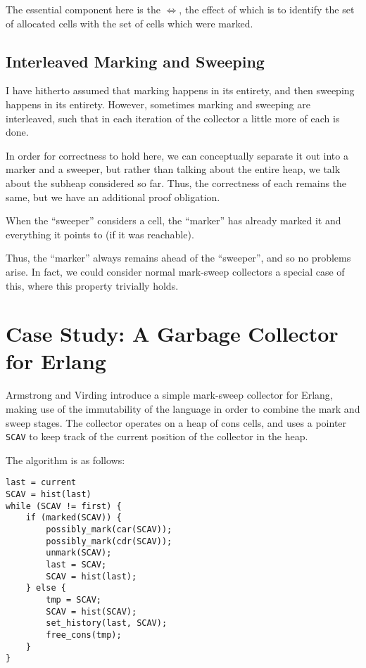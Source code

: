 The essential component here is the $\iff$, the effect of which is to
identify the set of allocated cells with the set of cells which were
marked.

\subsection{Interleaved Marking and Sweeping}
\label{sec:marksweep-sweeping-interleaved}

I have hitherto assumed that marking happens in its entirety, and then
sweeping happens in its entirety. However, sometimes marking and
sweeping are interleaved, such that in each iteration of the collector
a little more of each is done.

In order for correctness to hold here, we can conceptually separate it
out into a marker and a sweeper, but rather than talking about the
entire heap, we talk about the subheap considered so far. Thus, the
correctness of each remains the same, but we have an additional proof
obligation.

\begin{definition}
  \label{def:ms-interleaved}
  When the ``sweeper'' considers a cell, the ``marker'' has already
  marked it and everything it points to (if it was reachable).
\end{definition}

Thus, the ``marker'' always remains ahead of the ``sweeper'', and so
no problems arise. In fact, we could consider normal mark-sweep
collectors a special case of this, where this property trivially
holds.

\section{Case Study: A Garbage Collector for Erlang}
\label{sec:marksweep-example}

Armstrong and Virding\cite{Armstrong95} introduce a simple mark-sweep
collector for Erlang, making use of the immutability of the language
in order to combine the mark and sweep stages. The collector operates
on a heap of cons cells, and uses a pointer \texttt{SCAV} to keep
track of the current position of the collector in the heap.

The algorithm is as follows:

\begin{lstlisting}
last = current
SCAV = hist(last)
while (SCAV != first) {
    if (marked(SCAV)) {
        possibly_mark(car(SCAV));
        possibly_mark(cdr(SCAV));
        unmark(SCAV);
        last = SCAV;
        SCAV = hist(last);
    } else {
        tmp = SCAV;
        SCAV = hist(SCAV);
        set_history(last, SCAV);
        free_cons(tmp);
    }
}
\end{lstlisting}

